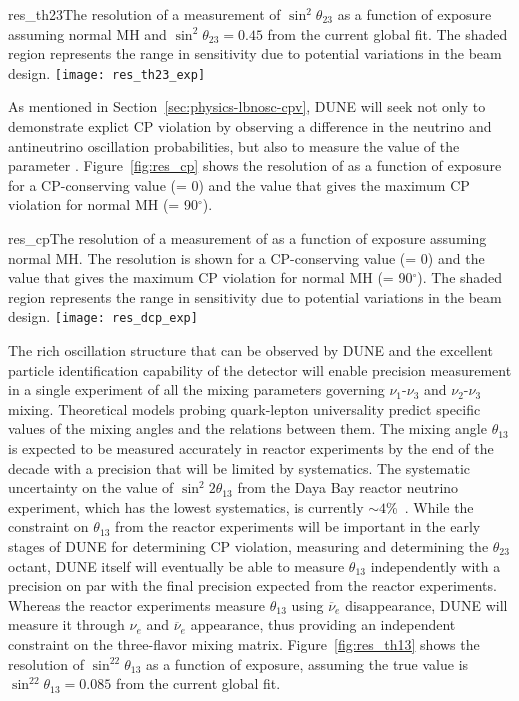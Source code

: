 \begin{cdrfigure}{res_th23}{The resolution of a measurement of $\sin^2\theta_{23}$ as a function of exposure assuming normal MH and $\sin^2\theta_{23} = 0.45$ from the current global fit. The shaded region represents the range in sensitivity due to potential variations in the beam design.  }
 \texttt{[image: res\_th23\_exp]}
\end{cdrfigure}


As mentioned in Section~\ref{sec:physics-lbnosc-cpv}, DUNE will seek not only to demonstrate explict CP violation by observing a difference in the neutrino and antineutrino oscillation probabilities, but also to measure the value of the parameter \deltacp.  Figure~\ref{fig:res_cp} shows the resolution of \deltacp as a function of exposure for a CP-conserving value (\deltacp = 0) and the value that gives the maximum CP violation for normal MH (\deltacp = 90\mbox{$^{\circ}$}).

\begin{cdrfigure}{res_cp}{The resolution of a measurement of \deltacp as a function of exposure assuming normal MH.  The resolution is shown for a CP-conserving value (\deltacp = 0) and the value that gives the maximum CP violation for normal MH (\deltacp = 90\mbox{$^{\circ}$}). The shaded region represents the range in sensitivity due to potential variations in the beam design.  }
 \texttt{[image: res\_dcp\_exp]}
\end{cdrfigure}

The rich oscillation structure that can be observed by DUNE and the
excellent particle identification capability of the detector
will enable precision measurement  in a single experiment of all the mixing parameters
governing $\nu_1$-$\nu_3$ and $\nu_2$-$\nu_3$ mixing. Theoretical models probing quark-lepton
universality predict specific values of the mixing angles and the
relations between them. The
mixing angle $\theta_{13}$ is
expected to be measured accurately in reactor experiments by the end
of the decade with a precision that will be limited by
systematics. The systematic uncertainty on the value of $\sin ^ 2 2
\theta_{13}$ from the Daya Bay reactor neutrino experiment, which has
the lowest systematics, is currently $\sim4$\%~\cite{An:2013zwz}.
While the constraint on $\theta_{13}$ from the reactor experiments will be
important in the
early stages of DUNE for determining CP violation, measuring
\deltacp and determining the $\theta_{23}$ octant, 
DUNE itself will eventually be able to measure
$\theta_{13}$ independently with a precision on par with the final
precision expected from the reactor experiments. 
Whereas the reactor experiments measure $\theta_{13}$ using $\overline{\nu}_e$
disappearance, DUNE will measure it through $\nu_e$ and
$\overline{\nu}_e$ appearance, thus providing an independent constraint on
the three-flavor mixing matrix.   Figure~\ref{fig:res_th13} shows the resolution of $\sin^22\theta_{13}$ as a function of exposure, assuming the true value is $\sin^22\theta_{13} = 0.085$ from the current global fit.

